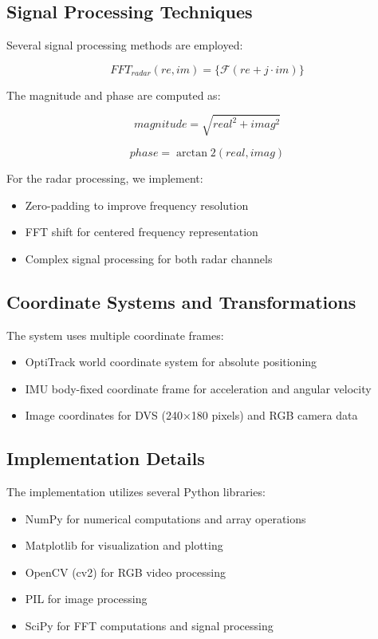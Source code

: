 \documentclass[12pt,a4paper]{article}
\begin{document}
\subsection{Signal Processing Techniques}

Several signal processing methods are employed:

\begin{equation}
    FFT_{radar}(re, im) = \{\mathcal{F}(re + j\cdot im)\}
\end{equation}

The magnitude and phase are computed as:

\begin{equation}
    magnitude = \sqrt{real^2 + imag^2}
\end{equation}

\begin{equation}
    phase = \arctan2(real, imag)
\end{equation}

For the radar processing, we implement:
\begin{itemize}
    \item Zero-padding to improve frequency resolution
    \item FFT shift for centered frequency representation
    \item Complex signal processing for both radar channels
\end{itemize}

\subsection{Coordinate Systems and Transformations}

The system uses multiple coordinate frames:
\begin{itemize}
    \item OptiTrack world coordinate system for absolute positioning
    \item IMU body-fixed coordinate frame for acceleration and angular velocity
    \item Image coordinates for DVS (240×180 pixels) and RGB camera data
\end{itemize}

\subsection{Implementation Details}

The implementation utilizes several Python libraries:
\begin{itemize}
    \item NumPy for numerical computations and array operations
    \item Matplotlib for visualization and plotting
    \item OpenCV (cv2) for RGB video processing
    \item PIL for image processing
    \item SciPy for FFT computations and signal processing
\end{itemize}
\end{document}
